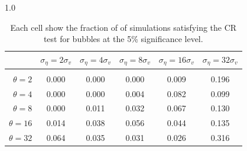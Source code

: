 \documentclass[12pt]{article}
\begin{document}
\begin{table}[h!]
\vspace{10pt}
\begin{subtable}{1.0\textwidth}
    \centering
\begin{tabular}{rccccc}
\hline  
            & \multicolumn{1}{l}{$\sigma_{\eta} =2\sigma_{v}$} & \multicolumn{1}{l}{$\sigma_{\eta} =4\sigma_{v}$} & \multicolumn{1}{l}{$\sigma_{\eta} =8\sigma_{v}$} & \multicolumn{1}{l}{$\sigma_{\eta} =16\sigma_{v}$} & \multicolumn{1}{l}{$\sigma_{\eta} =32\sigma_{v}$} \\ \hline  \vspace{-3mm} \\        
$\theta=2$  & 0.000                                             & 0.000                                             & 0.000                                             & 0.009                                              & 0.196                                              \\ \hline
$\theta=4$  & 0.000                                             & 0.000                                             & 0.004                                             & 0.082                                              & 0.099                                              \\ \hline
$\theta=8$  & 0.000                                             & 0.011                                             & 0.032                                             & 0.067                                              & 0.130                                              \\ \hline
$\theta=16$ & 0.014                                             & 0.038                                             & 0.056                                             & 0.044                                              & 0.135                                              \\ \hline
$\theta=32$ & 0.064                                             & 0.035                                             & 0.031                                             & 0.026                                              & 0.316                                              \\ \hline
\end{tabular}
\end{subtable}

\caption{Each cell show the fraction of of simulations satisfying the CR test for bubbles at the 5\% significance level.}
\label{CRtestsamps}
\end{table}
\pagebreak
\end{document}
